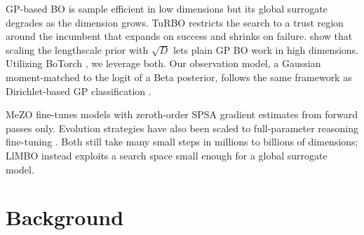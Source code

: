 \documentclass[twoside]{article}
\newcommand{\llmbo}{LlMBO}
\begin{document}
GP-based BO \citep{williams2006gaussian,garnett_bayesoptbook_2023} is sample efficient in low dimensions but its global surrogate degrades as the dimension grows. TuRBO \citep{eriksson2019turbo} restricts the search to a trust region around the incumbent that expands on success and shrinks on failure. \citet{hvarfner2024vanilla} show that scaling the lengthscale prior with $\sqrt{D}$ lets plain GP BO work in high dimensions. Utilizing BoTorch \citep{balandat2020botorch}, we leverage both. Our observation model, a Gaussian moment-matched to the logit of a Beta posterior, follows the same framework as Dirichlet-based GP classification \citep{milios2018dirichlet}.

MeZO \citep[memory-efficient zeroth-order optimizer,][]{malladi2023mezo} fine-tunes models with zeroth-order SPSA gradient estimates from forward passes only. Evolution strategies have also been scaled to full-parameter reasoning fine-tuning \citep{qiu2025evolution}. Both still take many small steps in millions to billions of dimensions; \llmbo{} instead exploits a search space small enough for a global surrogate model.
\section{Background}\label{sec:background}
\end{document}
